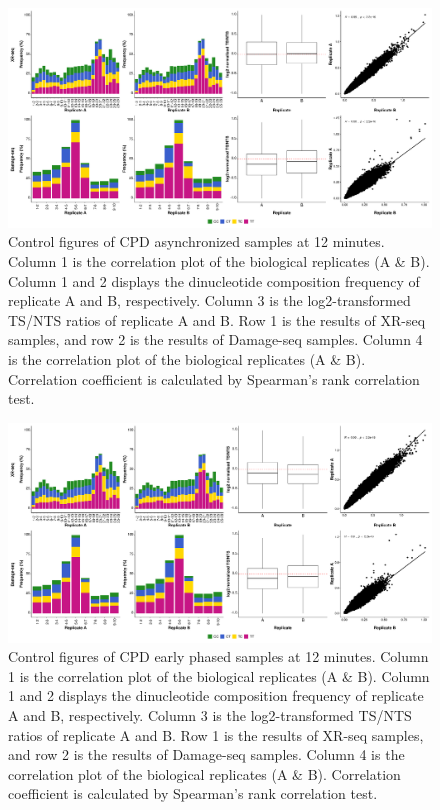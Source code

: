 \begin{figure}[H]
\begin{center}
\includegraphics[width=\textwidth]{Chapters/7_appendix/figures/supfig5}
\caption[Control figures of CPD asynchronized samples at 12 minutes.]{Control figures of CPD asynchronized samples at 12 minutes. Column 1 is the correlation plot of the biological replicates (A \& B). Column 1 and 2 displays the dinucleotide composition frequency of replicate A and B, respectively. Column 3 is the log2-transformed TS/NTS ratios of replicate A and B. Row 1 is the results of XR-seq samples, and row 2 is the results of Damage-seq samples. Column 4 is the correlation plot of the biological replicates (A \& B). Correlation coefficient is calculated by Spearman’s rank correlation test.}
\label{supfig:control4}
\end{center}
\end{figure}


\begin{figure}[H]
\begin{center}
\includegraphics[width=\textwidth]{Chapters/7_appendix/figures/supfig6}
\caption[Control figures of CPD early phased samples at 12 minutes.]{Control figures of CPD early phased samples at 12 minutes. Column 1 is the correlation plot of the biological replicates (A \& B). Column 1 and 2 displays the dinucleotide composition frequency of replicate A and B, respectively. Column 3 is the log2-transformed TS/NTS ratios of replicate A and B. Row 1 is the results of XR-seq samples, and row 2 is the results of Damage-seq samples. Column 4 is the correlation plot of the biological replicates (A \& B). Correlation coefficient is calculated by Spearman’s rank correlation test.}
\label{supfig:control5}
\end{center}
\end{figure}



